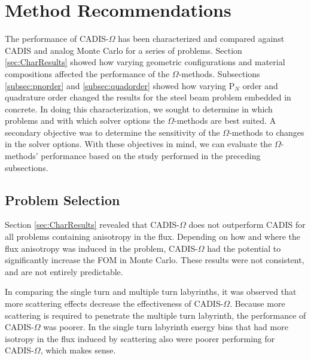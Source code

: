 \section{Method Recommendations}
\label{sec:method_recs}

The performance of CADIS-$\Omega$ has been characterized and compared against
CADIS and analog Monte Carlo for a series of problems.
Section \ref{sec:CharResults} showed how varying geometric configurations and
material compositions affected the
performance of the $\Omega$-methods.
Subsections \ref{subsec:pnorder} and \ref{subsec:quadorder} showed how varying
P$_N$ order and quadrature order changed the results 
for the steel beam problem embedded in concrete. In doing this
characterization, we sought to determine in which problems and with which solver
options the $\Omega$-methods are best suited. A secondary objective was to
determine the sensitivity of the $\Omega$-methods to changes in the solver
options. With these objectives in mind, we can evaluate the $\Omega$-methods'
performance based on the study performed in the preceding subsections.

\subsection{Problem Selection}
\label{sec:materials_recs}

Section \ref{sec:CharResults} revealed that CADIS-$\Omega$ does not outperform
CADIS for all problems containing anisotropy in the flux. Depending on how and
where the flux
anisotropy was induced in the problem, CADIS-$\Omega$ had the potential to
significantly increase the FOM in Monte Carlo. These results were not
consistent, and are not entirely predictable.

In comparing the single turn and multiple turn labyrinths, it was observed that
more scattering effects decrease the effectiveness of CADIS-$\Omega$. Because
more scattering is required to penetrate the multiple turn labyrinth,
the performance of CADIS-$\Omega$ was poorer. In the single turn labyrinth
energy bins that had more isotropy in the flux induced by scattering also were
poorer performing for CADIS-$\Omega$, which makes sense.

